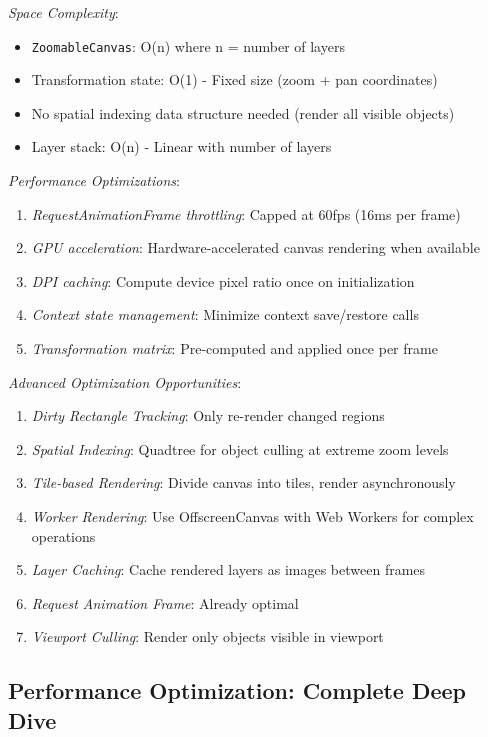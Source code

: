 \documentclass[11pt]{article}
\begin{document}
\emph{Space Complexity}:

\begin{itemize}
\item \texttt{ZoomableCanvas}: O(n) where n = number of layers
\item Transformation state: O(1) - Fixed size (zoom + pan coordinates)
\item No spatial indexing data structure needed (render all visible objects)
\item Layer stack: O(n) - Linear with number of layers
\end{itemize}

\emph{Performance Optimizations}:

\begin{enumerate}
\item \emph{RequestAnimationFrame throttling}: Capped at 60fps (16ms per frame)
\item \emph{GPU acceleration}: Hardware-accelerated canvas rendering when available
\item \emph{DPI caching}: Compute device pixel ratio once on initialization
\item \emph{Context state management}: Minimize context save/restore calls
\item \emph{Transformation matrix}: Pre-computed and applied once per frame
\end{enumerate}

\emph{Advanced Optimization Opportunities}:

\begin{enumerate}
\item \emph{Dirty Rectangle Tracking}: Only re-render changed regions
\item \emph{Spatial Indexing}: Quadtree for object culling at extreme zoom levels
\item \emph{Tile-based Rendering}: Divide canvas into tiles, render asynchronously
\item \emph{Worker Rendering}: Use OffscreenCanvas with Web Workers for complex operations
\item \emph{Layer Caching}: Cache rendered layers as images between frames
\item \emph{Request Animation Frame}: Already optimal
\item \emph{Viewport Culling}: Render only objects visible in viewport
\end{enumerate}
\subsection{Performance Optimization: Complete Deep Dive}
\label{sec:org6a7c96a}
\end{document}
